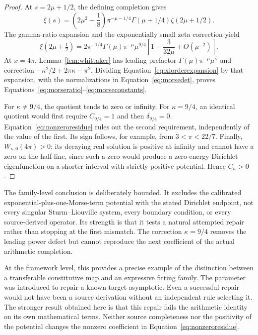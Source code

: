 \documentclass[11pt,letterpaper]{article}
\numberwithin{equation}{section}
\theoremstyle{definition}
\theoremstyle{remark}
\begin{document}
\begin{proof}
At $s=2\mu+1/2$, the defining completion gives
\[
 \xi(s)=\left(2\mu^2-\frac18\right)
 \pi^{-\mu-1/4}\Gamma(\mu+1/4)\zeta(2\mu+1/2).
\]
The gamma-ratio expansion and the exponentially small zeta correction yield
\begin{equation}
 \xi(2\mu+\tfrac12)
 =2\pi^{-1/4}\Gamma(\mu)\pi^{-\mu}\mu^{9/4}
   \left[1-\frac3{32\mu}+O(\mu^{-2})\right].
 \label{eq:xiorderexpansion}
\end{equation}
At $x=4\pi$, Lemma~\ref{lem:whittaker} has leading prefactor $\Gamma(\mu)\pi^{-\mu}\mu^\kappa$ and correction
$-\kappa^2/2+2\pi\kappa-\pi^2$. Dividing Equation~\eqref{eq:xiorderexpansion} by that expansion, with the normalizations in Equation~\eqref{eq:morsedet}, proves Equations~\eqref{eq:morseratio}--\eqref{eq:morseconstants}.

For $\kappa\neq9/4$, the quotient tends to zero or infinity. For $\kappa=9/4$, an identical quotient would first require $C_{9/4}=1$ and then $\delta_{9/4}=0$. Equation~\eqref{eq:nonzeroresidue} rules out the second requirement, independently of the value of the first. Its sign follows, for example, from $3<\pi<22/7$. Finally, $W_{\kappa,0}(4\pi)>0$: its decaying real solution is positive at infinity and cannot have a zero on the half-line, since such a zero would produce a zero-energy Dirichlet eigenfunction on a shorter interval with strictly positive potential. Hence $C_\kappa>0$.
\end{proof}

The family-level conclusion is deliberately bounded. It excludes the calibrated exponential-plus-one-Morse-term potential with the stated Dirichlet endpoint, not every singular Sturm--Liouville system, every boundary condition, or every source-derived operator. Its strength is that it tests a natural attempted repair rather than stopping at the first mismatch. The correction $\kappa=9/4$ removes the leading power defect but cannot reproduce the next coefficient of the actual arithmetic completion.

At the framework level, this provides a precise example of the distinction between a transferable constitutive map and an expressive fitting family. The parameter was introduced to repair a known target asymptotic. Even a successful repair would not have been a source derivation without an independent rule selecting it. The stronger result obtained here is that this repair fails the arithmetic identity on its own mathematical terms. Neither source completeness nor the positivity of the potential changes the nonzero coefficient in Equation~\eqref{eq:nonzeroresidue}.
\end{document}
